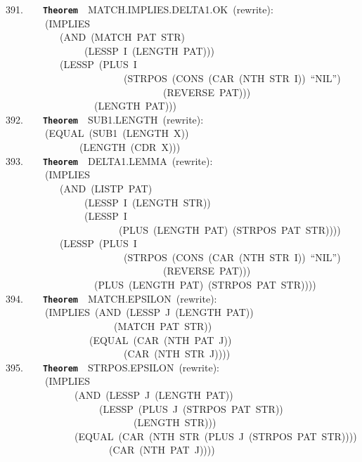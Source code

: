 \documentclass[11pt]{book}
\newenvironment{pubasis}{\begin{flushleft}\ttfamily\small}{\normalsize\rmfamily\end{flushleft}}
\newcommand{\axiomordefinition}[1]{\vspace{6pt}\texttt{\textbf{#1}}}
\begin{document}
\begin{pubasis}
391.~~~~\axiomordefinition{Theorem}~~MATCH.IMPLIES.DELTA1.OK~(rewrite):\\
~~~~~~~~(IMPLIES\\
~~~~~~~~~~~(AND~(MATCH~PAT~STR)\\
~~~~~~~~~~~~~~~~(LESSP~I~(LENGTH~PAT)))\\
~~~~~~~~~~~(LESSP~(PLUS~I\\
~~~~~~~~~~~~~~~~~~~~~~~~(STRPOS~(CONS~(CAR~(NTH~STR~I))~``NIL'')\\
~~~~~~~~~~~~~~~~~~~~~~~~~~~~~~~~(REVERSE~PAT)))\\
~~~~~~~~~~~~~~~~~~(LENGTH~PAT)))\\

392.~~~~\axiomordefinition{Theorem}~~SUB1.LENGTH~(rewrite):\\
~~~~~~~~(EQUAL~(SUB1~(LENGTH~X))\\
~~~~~~~~~~~~~~~(LENGTH~(CDR~X)))\\

393.~~~~\axiomordefinition{Theorem}~~DELTA1.LEMMA~(rewrite):\\
~~~~~~~~(IMPLIES\\
~~~~~~~~~~~(AND~(LISTP~PAT)\\
~~~~~~~~~~~~~~~~(LESSP~I~(LENGTH~STR))\\
~~~~~~~~~~~~~~~~(LESSP~I\\
~~~~~~~~~~~~~~~~~~~~~~~(PLUS~(LENGTH~PAT)~(STRPOS~PAT~STR))))\\
~~~~~~~~~~~(LESSP~(PLUS~I\\
~~~~~~~~~~~~~~~~~~~~~~~~(STRPOS~(CONS~(CAR~(NTH~STR~I))~``NIL'')\\
~~~~~~~~~~~~~~~~~~~~~~~~~~~~~~~~(REVERSE~PAT)))\\
~~~~~~~~~~~~~~~~~~(PLUS~(LENGTH~PAT)~(STRPOS~PAT~STR))))\\

394.~~~~\axiomordefinition{Theorem}~~MATCH.EPSILON~(rewrite):\\
~~~~~~~~(IMPLIES~(AND~(LESSP~J~(LENGTH~PAT))\\
~~~~~~~~~~~~~~~~~~~~~~(MATCH~PAT~STR))\\
~~~~~~~~~~~~~~~~~(EQUAL~(CAR~(NTH~PAT~J))\\
~~~~~~~~~~~~~~~~~~~~~~~~(CAR~(NTH~STR~J))))\\

395.~~~~\axiomordefinition{Theorem}~~STRPOS.EPSILON~(rewrite):\\
~~~~~~~~(IMPLIES\\
~~~~~~~~~~~~~~(AND~(LESSP~J~(LENGTH~PAT))\\
~~~~~~~~~~~~~~~~~~~(LESSP~(PLUS~J~(STRPOS~PAT~STR))\\
~~~~~~~~~~~~~~~~~~~~~~~~~~(LENGTH~STR)))\\
~~~~~~~~~~~~~~(EQUAL~(CAR~(NTH~STR~(PLUS~J~(STRPOS~PAT~STR))))\\
~~~~~~~~~~~~~~~~~~~~~(CAR~(NTH~PAT~J))))\\


\end{pubasis}
\end{document}
